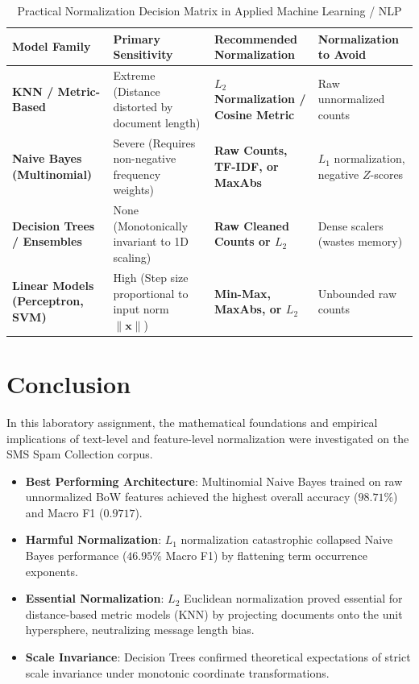 \documentclass[12pt]{article}
\begin{document}
\begin{table}[H]
\centering
\caption{Practical Normalization Decision Matrix in Applied Machine Learning / NLP}
\label{tab:decision_matrix}
\vspace{0.2cm}
\begin{tabular}{p{3.5cm}p{4.0cm}p{3.8cm}p{3.5cm}}
\toprule
\textbf{Model Family} & \textbf{Primary Sensitivity} & \textbf{Recommended Normalization} & \textbf{Normalization to Avoid} \\
\midrule
\textbf{KNN / Metric-Based} & Extreme (Distance distorted by document length) & \textbf{$L_2$ Normalization / Cosine Metric} & Raw unnormalized counts \\
\addlinespace
\textbf{Naive Bayes (Multinomial)} & Severe (Requires non-negative frequency weights) & \textbf{Raw Counts, TF-IDF, or MaxAbs} & $L_1$ normalization, negative $Z$-scores \\
\addlinespace
\textbf{Decision Trees / Ensembles} & None (Monotonically invariant to 1D scaling) & \textbf{Raw Cleaned Counts or $L_2$} & Dense scalers (wastes memory) \\
\addlinespace
\textbf{Linear Models (Perceptron, SVM)} & High (Step size proportional to input norm $\|\mathbf{x}\|$) & \textbf{Min-Max, MaxAbs, or $L_2$} & Unbounded raw counts \\
\bottomrule
\end{tabular}
\end{table}

\section{Conclusion}
In this laboratory assignment, the mathematical foundations and empirical implications of text-level and feature-level normalization were investigated on the SMS Spam Collection corpus.
\begin{itemize}
    \item \textbf{Best Performing Architecture}: Multinomial Naive Bayes trained on raw unnormalized BoW features achieved the highest overall accuracy ($98.71\%$) and Macro F1 ($0.9717$).
    \item \textbf{Harmful Normalization}: $L_1$ normalization catastrophic collapsed Naive Bayes performance ($46.95\%$ Macro F1) by flattening term occurrence exponents.
    \item \textbf{Essential Normalization}: $L_2$ Euclidean normalization proved essential for distance-based metric models (KNN) by projecting documents onto the unit hypersphere, neutralizing message length bias.
    \item \textbf{Scale Invariance}: Decision Trees confirmed theoretical expectations of strict scale invariance under monotonic coordinate transformations.
\end{itemize}
\end{document}
